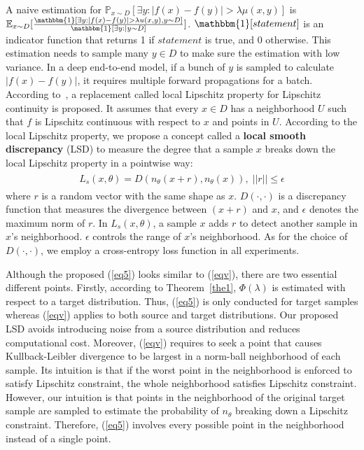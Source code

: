 \documentclass[journal,twocolumn]{IEEEtran}
\theoremstyle{definition}
\begin{document}
A naive estimation for $\mathbb{P}_{x\sim D}[\exists y: |f(x)-f(y)|>\lambda\mu(x,y)]$ is $\mathbb{E}_{x\sim D}[\frac{\mathbbm{1}[\exists y:|f(x)-f(y)|>\lambda u(x,y),y\sim D]}{\mathbbm{1}[\exists y:|y\sim D]}]$. $\mathbbm{1}[statement]$ is an indicator function that returns 1 if $statement$ is true, and 0 otherwise. This estimation needs to sample many $y\in D$ to make sure the estimation with low variance. In a deep end-to-end model, if a bunch of $y$ is sampled to calculate $|f(x)-f(y)|$, it requires multiple forward propagations for a batch. According to~\cite{grandvalet2004semi-supervised}, a replacement called local Lipschitz property for Lipschitz continuity is proposed. It assumes that every $x\in D$ has a neighborhood $U$ such that $f$ is Lipschitz continuous with respect to $x$ and points in $U$. According to the local Lipschitz property, we propose a concept called a {\bf local smooth discrepancy} (LSD) to measure the degree that a sample $x$ breaks down the local Lipschitz property in a pointwise way:
\begin{align}
\begin{gathered}
L_s(x,\theta)=D(n_\theta(x+r),n_\theta(x)),\;||r||\leq\epsilon \label{eq5}
\end{gathered}
\end{align}
where $r$ is a random vector with the same shape as $x$. $D(\cdot,\cdot)$ is a discrepancy function that measures the divergence between $(x+r)$ and $x$, and $\epsilon$ denotes the maximum norm of $r$. In $L_s(x,\theta)$, a sample $x$ adds $r$ to detect another sample in $x$'s neighborhood. $\epsilon$ controls the range of $x$'s neighborhood. As for the choice of $D(\cdot,\cdot)$, we employ a cross-entropy loss function in all experiments.

Although the proposed (\ref{eq5}) looks similar to (\ref{eqv}), there are two essential different points. Firstly, according to Theorem~\ref{the1}, $\Phi(\lambda)$ is estimated with respect to a target distribution. Thus, (\ref{eq5}) is only conducted for target samples whereas (\ref{eqv}) applies to both source and target distributions. Our proposed LSD avoids introducing noise from a source distribution and reduces computational cost. Moreover, (\ref{eqv}) requires to seek a point that causes Kullback-Leibler divergence to be largest in a norm-ball neighborhood of each sample. Its intuition is that if the worst point in the neighborhood is enforced to satisfy Lipschitz constraint, the whole neighborhood satisfies Lipschitz constraint. However, our intuition is that points in the neighborhood of the original target sample are sampled to estimate the probability of $n_\theta$ breaking down a Lipschitz constraint. Therefore, (\ref{eq5}) involves every possible point in the neighborhood instead of a single point.
\end{document}

